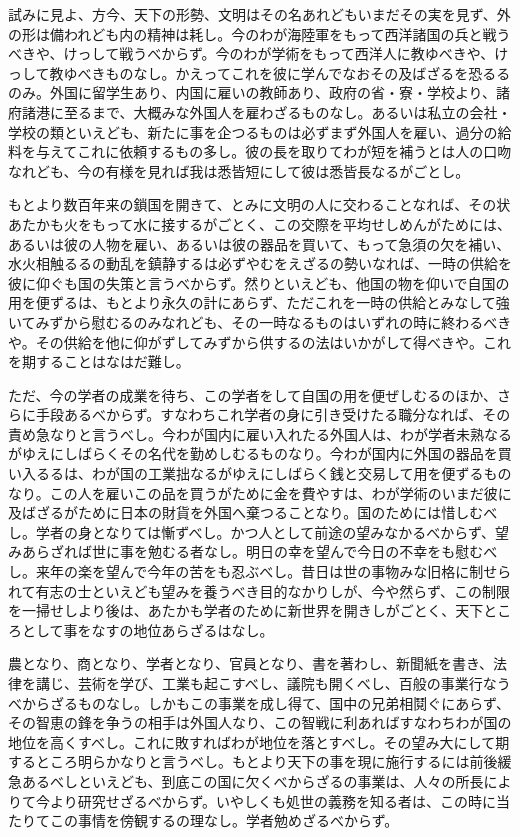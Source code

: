 \documentclass[a4paper, platex, dvipdfmx]{jsarticle}
\begin{document}
試みに見よ、方今、天下の形勢、文明はその名あれどもいまだその実を見ず、外の形は備われども内の精神は耗し。今のわが海陸軍をもって西洋諸国の兵と戦うべきや、けっして戦うべからず。今のわが学術をもって西洋人に教ゆべきや、けっして教ゆべきものなし。かえってこれを彼に学んでなおその及ばざるを恐るるのみ。外国に留学生あり、内国に雇いの教師あり、政府の省・寮・学校より、諸府諸港に至るまで、大概みな外国人を雇わざるものなし。あるいは私立の会社・学校の類といえども、新たに事を企つるものは必ずまず外国人を雇い、過分の給料を与えてこれに依頼するもの多し。彼の長を取りてわが短を補うとは人の口吻なれども、今の有様を見れば我は悉皆短にして彼は悉皆長なるがごとし。

もとより数百年来の鎖国を開きて、とみに文明の人に交わることなれば、その状あたかも火をもって水に接するがごとく、この交際を平均せしめんがためには、あるいは彼の人物を雇い、あるいは彼の器品を買いて、もって急須の欠を補い、水火相触るるの動乱を鎮静するは必ずやむをえざるの勢いなれば、一時の供給を彼に仰ぐも国の失策と言うべからず。然りといえども、他国の物を仰いで自国の用を便ずるは、もとより永久の計にあらず、ただこれを一時の供給とみなして強いてみずから慰むるのみなれども、その一時なるものはいずれの時に終わるべきや。その供給を他に仰がずしてみずから供するの法はいかがして得べきや。これを期することはなはだ難し。

ただ、今の学者の成業を待ち、この学者をして自国の用を便ぜしむるのほか、さらに手段あるべからず。すなわちこれ学者の身に引き受けたる職分なれば、その責め急なりと言うべし。今わが国内に雇い入れたる外国人は、わが学者未熟なるがゆえにしばらくその名代を勤めしむるものなり。今わが国内に外国の器品を買い入るるは、わが国の工業拙なるがゆえにしばらく銭と交易して用を便ずるものなり。この人を雇いこの品を買うがために金を費やすは、わが学術のいまだ彼に及ばざるがために日本の財貨を外国へ棄つることなり。国のためには惜しむべし。学者の身となりては慚ずべし。かつ人として前途の望みなかるべからず、望みあらざれば世に事を勉むる者なし。明日の幸を望んで今日の不幸をも慰むべし。来年の楽を望んで今年の苦をも忍ぶべし。昔日は世の事物みな旧格に制せられて有志の士といえども望みを養うべき目的なかりしが、今や然らず、この制限を一掃せしより後は、あたかも学者のために新世界を開きしがごとく、天下ところとして事をなすの地位あらざるはなし。

農となり、商となり、学者となり、官員となり、書を著わし、新聞紙を書き、法律を講じ、芸術を学び、工業も起こすべし、議院も開くべし、百般の事業行なうべからざるものなし。しかもこの事業を成し得て、国中の兄弟相鬩ぐにあらず、その智恵の鋒を争うの相手は外国人なり、この智戦に利あればすなわちわが国の地位を高くすべし。これに敗すればわが地位を落とすべし。その望み大にして期するところ明らかなりと言うべし。もとより天下の事を現に施行するには前後緩急あるべしといえども、到底この国に欠くべからざるの事業は、人々の所長によりて今より研究せざるべからず。いやしくも処世の義務を知る者は、この時に当たりてこの事情を傍観するの理なし。学者勉めざるべからず。
\end{document}
